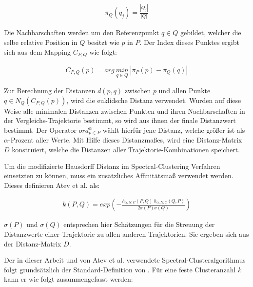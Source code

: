 \begin{ceqn}
\begin{align}
\label{eq_atev_relPos}
    \pi_Q(q_j) = \frac{|Q_j|}{|Q|}
\end{align}
\end{ceqn}

Die Nachbarschaften werden um den Referenzpunkt $q \in Q$ gebildet, welcher die selbe relative Position
in $Q$ besitzt wie $p$ in $P$. Der Index dieses Punktes ergibt sich aus dem Mapping $C_{P,Q}$ wie folgt:

\begin{ceqn}
\begin{align}
\label{eq_atev_findPointAtRelPow}
    C_{P,Q}(p) = arg\ \underset{q \in Q}{min}\ |\pi_P(p) - \pi_Q(q)|
\end{align}
\end{ceqn}

Zur Berechnung der Distanzen $d(p,q)$ zwischen $p$ und allen Punkte $q \in N_Q(C_{P,Q}(p))$, wird die euklidsche
Distanz verwendet. Wurden auf diese Weise alle minimalen Distanzen zwischen Punkten und ihren Nachbarschaften in
der Vergleichs-Trajektorie bestimmt, so wird aus ihnen der finale Distanzwert bestimmt. Der Operator
$ord_{p \in P}^{\alpha}$ wählt hierfür jene Distanz, welche größer ist als $\alpha$-Prozent aller Werte.
Mit Hilfe dieses Distanzmaßes, wird eine Distanz-Matrix $D$ konstruiert, welche die Distanzen
aller Trajektorie-Kombinationen speichert.

Um die modifizierte Hausdorff Distanz im Spectral-Clustering Verfahren einsetzten zu können, muss ein
zusätzliches Affinitätsmaß verwendet werden.
Dieses definieren Atev et al. als:

\begin{ceqn}
\begin{align}
    k(P,Q) = exp (- \frac{h_{\alpha, N, C}(P,Q)\ h_{\alpha, N, C}(Q,P)}{2 \sigma(P) \sigma(Q)})
\end{align}
\end{ceqn}

$\sigma(P)$ und $\sigma(Q)$ entsprechen hier Schätzungen für die Streuung der Distanzwerte einer Trajektorie
zu allen anderen Trajektorien. Sie ergeben sich aus der Distanz-Matrix $D$.

Der in dieser Arbeit und von Atev et al. verwendete Spectral-Clusteralgorithmus folgt grundsätzlich
der Standard-Definition von \cite[]{Ng2002}.
Für eine feste Clusteranzahl $k$ kann er wie folgt zusammengefasst werden:

